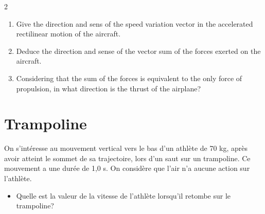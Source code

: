 \documentclass[a4paper,11pt,fleqn]{scrartcl}%
\begin{document}
\begin{multicols}{2}
\begin{enumerate}
\item Give the direction and sens of the speed variation vector in the accelerated rectilinear motion of the aircraft.
\item Deduce the direction and sense of the vector sum of the forces exerted on the aircraft.
\item Considering that the sum of the forces is equivalent to the only force of propulsion, in what direction is the thrust of the airplane?
\end{enumerate}

\section{Trampoline}
On s'intéresse au mouvement vertical vers le bas d'un athlète de 70 kg, après avoir atteint le  sommet de sa trajectoire, lors d'un saut sur un trampoline. Ce mouvement a une durée de 1,0 s. On considère que l'air n'a aucune action sur l'athlète.
\begin{itemize}
\item Quelle est la valeur de la vitesse de l'athlète lorsqu'il retombe  sur le trampoline?
\end{itemize}
\end{multicols}
\end{document}
